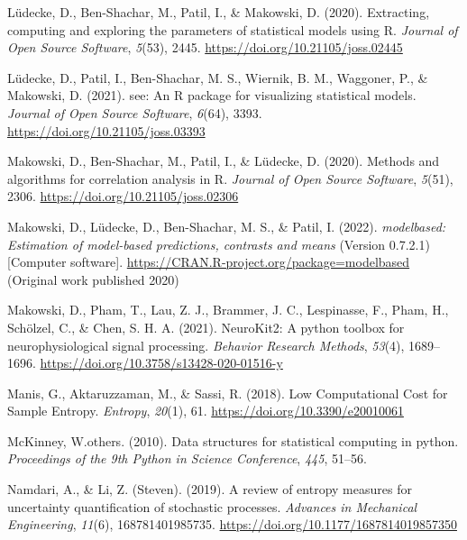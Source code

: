 \documentclass[
  man]{apa6}
\newlength{\cslhangindent}
\newlength{\cslentryspacingunit} %
\newenvironment{CSLReferences}[2] %
 {%
  \setlength{\parindent}{0pt}
  \ifodd #1
  \let\oldpar\par
  \def\par{\hangindent=\cslhangindent\oldpar}
  \fi
  \setlength{\parskip}{#2\cslentryspacingunit}
 }%
 {}
\begin{document}
\begin{CSLReferences}{1}{0}
\leavevmode{}%
Lüdecke, D., Ben-Shachar, M., Patil, I., \& Makowski, D. (2020). Extracting, computing and exploring the parameters of statistical models using {R}. \emph{Journal of Open Source Software}, \emph{5}(53), 2445. \url{https://doi.org/10.21105/joss.02445}

\leavevmode{}%
Lüdecke, D., Patil, I., Ben-Shachar, M. S., Wiernik, B. M., Waggoner, P., \& Makowski, D. (2021). {see}: An {R} package for visualizing statistical models. \emph{Journal of Open Source Software}, \emph{6}(64), 3393. \url{https://doi.org/10.21105/joss.03393}

\leavevmode{}%
Makowski, D., Ben-Shachar, M., Patil, I., \& Lüdecke, D. (2020). Methods and algorithms for correlation analysis in {R}. \emph{Journal of Open Source Software}, \emph{5}(51), 2306. \url{https://doi.org/10.21105/joss.02306}

\leavevmode{}%
Makowski, D., Lüdecke, D., Ben-Shachar, M. S., \& Patil, I. (2022). \emph{{modelbased}: Estimation of model-based predictions, contrasts and means} (Version 0.7.2.1) {[}Computer software{]}. \url{https://CRAN.R-project.org/package=modelbased} (Original work published 2020)

\leavevmode{}%
Makowski, D., Pham, T., Lau, Z. J., Brammer, J. C., Lespinasse, F., Pham, H., Schölzel, C., \& Chen, S. H. A. (2021). {NeuroKit}2: A python toolbox for neurophysiological signal processing. \emph{Behavior Research Methods}, \emph{53}(4), 1689--1696. \url{https://doi.org/10.3758/s13428-020-01516-y}

\leavevmode{}%
Manis, G., Aktaruzzaman, M., \& Sassi, R. (2018). Low Computational Cost for Sample Entropy. \emph{Entropy}, \emph{20}(1), 61. \url{https://doi.org/10.3390/e20010061}

\leavevmode{}%
McKinney, W.others. (2010). Data structures for statistical computing in python. \emph{Proceedings of the 9th Python in Science Conference}, \emph{445}, 51--56.

\leavevmode{}%
Namdari, A., \& Li, Z. (Steven). (2019). A review of entropy measures for uncertainty quantification of stochastic processes. \emph{Advances in Mechanical Engineering}, \emph{11}(6), 168781401985735. \url{https://doi.org/10.1177/1687814019857350}


\end{CSLReferences}
\end{document}
